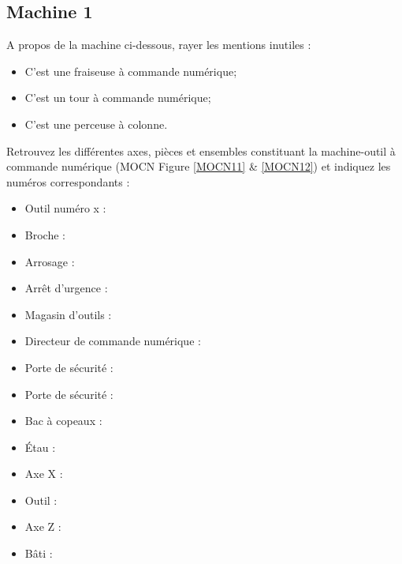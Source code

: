\documentclass[12pt]{article}
\newcounter{exo}
\newenvironment{exo}{\stepcounter{exo}\vspace{0.5cm}{\bfseries Question \theexo\ :}}{\par\vspace{0.5cm}}
\begin{document}
\subsection{Machine 1}

\begin{exo}\label{exo1} A propos de la machine ci-dessous, rayer les mentions inutiles :
\begin{itemize}
    \item C'est une fraiseuse à commande numérique;
    \item C'est un tour à commande numérique;
    \item C'est une perceuse à colonne.
\end{itemize}
\end{exo}


\begin{exo}\label{exo1} Retrouvez les différentes axes, pièces et ensembles constituant la machine-outil à commande numérique (MOCN Figure \ref{MOCN11} \& \ref{MOCN12}) et indiquez les numéros correspondants :\\ \end{exo}
\begin{minipage}{.55\linewidth}
\begin{itemize}
    \item Outil numéro x :
    \item Broche :
    \item Arrosage :
    \item Arrêt d’urgence :
    \item Magasin d’outils :
    \item Directeur de commande numérique :
    \item Porte de sécurité :
\end{itemize}

\end{minipage}
\begin{minipage}{.44\linewidth}
\begin{itemize}
    \item Porte de sécurité :
    \item Bac à copeaux :
    \item Étau :
    \item Axe X :
    \item Outil :
    \item Axe Z :
    \item Bâti :
\end{itemize}
\end{minipage}
\end{document}
